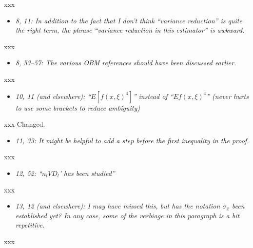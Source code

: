 \documentclass[11pt,notitlepage,onecolumn]{article}
\newcommand{\noi}{\noindent}
\begin{document}
\noi
xxx  
\medskip 



\begin{itemize}
\item[] \textit{8, 11: In addition to the fact that I don't think ``variance reduction'' is quite the right term, the phrase ``variance reduction in this estimator'' is awkward.}
\end{itemize}

\noi
xxx  
\medskip 



\begin{itemize}
\item[] \textit{8, 53--57: The various OBM references should have been discussed earlier.}
\end{itemize}

\noi
xxx  
\medskip 



\begin{itemize}
\item[] \textit{10, 11 (and elsewhere): ``$E[f(x, \xi)^4]$'' instead of ``$Ef(x, \xi)^4$'' (never hurts to use some brackets to reduce ambiguity)}
\end{itemize}

\noi
xxx Changed. 
\medskip 



\begin{itemize}
\item[] \textit{11, 33: It might be helpful to add a step before the first inequality in the proof.}
\end{itemize}

\noi
xxx  
\medskip 



\begin{itemize}
\item[] \textit{12, 52: ``$n_l VD_l$' has been studied''}
\end{itemize}

\noi
xxx  
\medskip 



\begin{itemize}
\item[] \textit{13, 12 (and elsewhere): I may have missed this, but has the notation $\sigma_{\hat{x}}$ been established yet? 
In any case, some of the verbiage in this paragraph is a bit repetitive.}
\end{itemize}

\noi
xxx  
\medskip 
\end{document}
